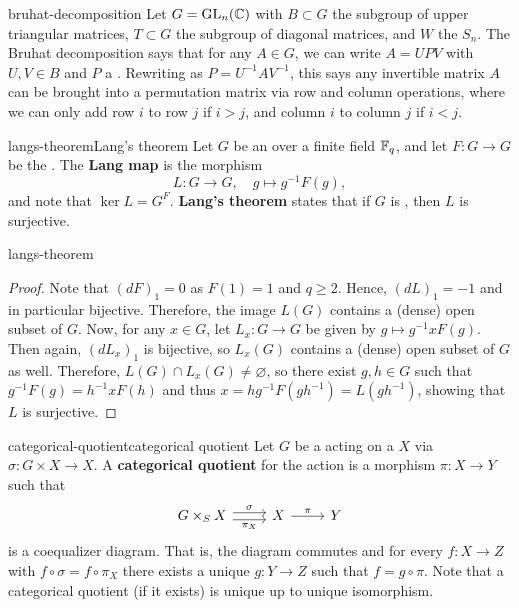 \begin{example}{bruhat-decomposition}
    Let $G = \textup{GL}_n(\mathbb{C})$ with $B \subset G$ the subgroup of upper triangular matrices, $T \subset G$ the subgroup of diagonal matrices, and $W$ the  $S_n$. The Bruhat decomposition says that for any $A \in G$, we can write $A = U P V$ with $U, V \in B$ and $P$ a . Rewriting as $P = U^{-1} A V^{-1}$, this says any invertible matrix $A$ can be brought into a permutation matrix via row and column operations, where we can only add row $i$ to row $j$ if $i > j$, and column $i$ to column $j$ if $i < j$.
\end{example}

\begin{topic}{langs-theorem}{Lang's theorem}
    Let $G$ be an  over a finite field $\mathbb{F}_q$, and let $F : G \to G$ be the . The \textbf{Lang map} is the morphism
    \[ L : G \to G, \quad g \mapsto g^{-1} F(g) , \]
    and note that $\ker L = G^F$. \textbf{Lang's theorem} states that if $G$ is , then $L$ is surjective.
\end{topic}

\begin{example}{langs-theorem}
    \begin{proof}
        Note that $(dF)_1 = 0$ as $F(1) = 1$ and $q \ge 2$. Hence, $(dL)_1 = -1$ and in particular bijective. Therefore, the image $L(G)$ contains a (dense) open subset of $G$. Now, for any $x \in G$, let $L_x : G \to G$ be given by $g \mapsto g^{-1} x F(g)$. Then again, $(dL_x)_1$ is bijective, so $L_x(G)$ contains a (dense) open subset of $G$ as well. Therefore, $L(G) \cap L_x(G) \ne \varnothing$, so there exist $g, h \in G$ such that $g^{-1} F(g) = h^{-1} x F(h)$ and thus $x = hg^{-1} F(gh^{-1}) = L(gh^{-1})$, showing that $L$ is surjective.
    \end{proof}
\end{example}

\begin{topic}{categorical-quotient}{categorical quotient}
    Let $G$ be a  acting on a  $X$ via $\sigma : G \times X \to X$. A \textbf{categorical quotient} for the action is a morphism $\pi : X \to Y$ such that
    \[ \begin{tikzcd} G \times_S X \arrow[shift left=0.25em]{r}{\sigma} \arrow[swap,shift right=0.25em]{r}{\pi_X} & X \arrow{r}{\pi} & Y \end{tikzcd} \]
    is a coequalizer diagram. That is, the diagram commutes and for every $f : X \to Z$ with $f \circ \sigma = f \circ \pi_X$ there exists a unique $g : Y \to Z$ such that $f = g \circ \pi$. Note that a categorical quotient (if it exists) is unique up to unique isomorphism.
\end{topic}

